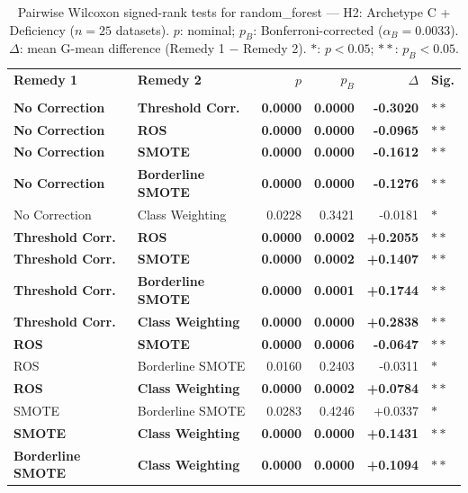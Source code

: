 \begin{table}[ht]
\centering
\scriptsize
\caption{Pairwise Wilcoxon signed-rank tests for random_forest --- H2: Archetype C + Deficiency ($n=25$ datasets). $p$: nominal; $p_B$: Bonferroni-corrected ($\alpha_B=0.0033$). $\Delta$: mean G-mean difference (Remedy 1 $-$ Remedy 2). $\ast$: $p<0.05$; $\ast\ast$: $p_B<0.05$.}
\label{tab:wilcoxon_random_forest_h2}
\begin{tabular}{llrrrl}
\toprule
\textbf{Remedy 1} & \textbf{Remedy 2} & \textbf{$p$} & \textbf{$p_B$} & \textbf{$\Delta$} &  \textbf{Sig.} \\\\
\midrule
    \textbf{No Correction} & \textbf{Threshold Corr.} & \textbf{0.0000} & \textbf{0.0000} & \textbf{-0.3020} & $\ast\ast$ \\
    \textbf{No Correction} & \textbf{ROS} & \textbf{0.0000} & \textbf{0.0000} & \textbf{-0.0965} & $\ast\ast$ \\
    \textbf{No Correction} & \textbf{SMOTE} & \textbf{0.0000} & \textbf{0.0000} & \textbf{-0.1612} & $\ast\ast$ \\
    \textbf{No Correction} & \textbf{Borderline SMOTE} & \textbf{0.0000} & \textbf{0.0000} & \textbf{-0.1276} & $\ast\ast$ \\
    No Correction & Class Weighting & 0.0228 & 0.3421 & -0.0181 & $\ast$ \\
    \textbf{Threshold Corr.} & \textbf{ROS} & \textbf{0.0000} & \textbf{0.0002} & \textbf{+0.2055} & $\ast\ast$ \\
    \textbf{Threshold Corr.} & \textbf{SMOTE} & \textbf{0.0000} & \textbf{0.0002} & \textbf{+0.1407} & $\ast\ast$ \\
    \textbf{Threshold Corr.} & \textbf{Borderline SMOTE} & \textbf{0.0000} & \textbf{0.0001} & \textbf{+0.1744} & $\ast\ast$ \\
    \textbf{Threshold Corr.} & \textbf{Class Weighting} & \textbf{0.0000} & \textbf{0.0000} & \textbf{+0.2838} & $\ast\ast$ \\
    \textbf{ROS} & \textbf{SMOTE} & \textbf{0.0000} & \textbf{0.0006} & \textbf{-0.0647} & $\ast\ast$ \\
    ROS & Borderline SMOTE & 0.0160 & 0.2403 & -0.0311 & $\ast$ \\
    \textbf{ROS} & \textbf{Class Weighting} & \textbf{0.0000} & \textbf{0.0002} & \textbf{+0.0784} & $\ast\ast$ \\
    SMOTE & Borderline SMOTE & 0.0283 & 0.4246 & +0.0337 & $\ast$ \\
    \textbf{SMOTE} & \textbf{Class Weighting} & \textbf{0.0000} & \textbf{0.0000} & \textbf{+0.1431} & $\ast\ast$ \\
    \textbf{Borderline SMOTE} & \textbf{Class Weighting} & \textbf{0.0000} & \textbf{0.0000} & \textbf{+0.1094} & $\ast\ast$ \\
\bottomrule
\end{tabular}
\end{table}
